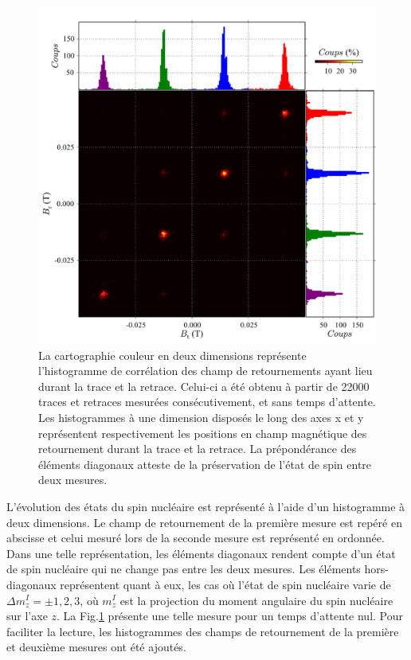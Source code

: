 \begin{figure}
\includegraphics[scale=0.45]{Resultats/Hist2D/Hist2D.pdf} 
\caption{La cartographie couleur en deux dimensions représente l’histogramme de corrélation des champ de retournements ayant lieu durant la trace et la retrace. Celui-ci a été obtenu à partir de 22000 traces et retraces mesurées consécutivement, et sans temps d'attente. Les histogrammes à une dimension disposés le long des axes x et y représentent respectivement les positions en champ magnétique des retournement durant la trace et la retrace. La prépondérance des éléments diagonaux atteste de la préservation de l'état de spin entre deux mesures.}
\label{correlations}
\end{figure}

L'évolution des états du spin nucléaire est représenté à l'aide d'un histogramme à deux dimensions. Le champ de retournement de la première mesure est repéré en abscisse et celui mesuré lors de la seconde mesure est représenté en ordonnée. Dans une telle représentation, les éléments diagonaux rendent compte d'un état de spin nucléaire qui ne change pas entre les deux mesures. Les éléments hors-diagonaux représentent quant à eux, les cas où l'état de spin nucléaire varie de $\Delta m_z^I = \pm 1,2,3$, où $m_z^I$ est la projection du moment angulaire du spin nucléaire sur l'axe $z$. La Fig.\ref{correlations} présente une telle mesure pour un temps d'attente nul. Pour faciliter la lecture, les histogrammes des champs de retournement de la première et deuxième mesures ont été ajoutés.

